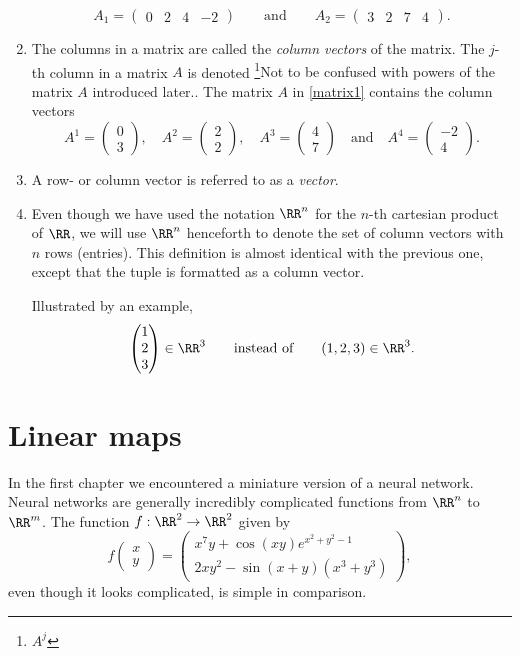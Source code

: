 \documentclass{article}
\begin{document}
\begin{enumerate}
$$
A_1 = \begin{pmatrix}
0 & 2 & 4 & -2
\end{pmatrix}
\qquad\text{and}\qquad
A_2 = \begin{pmatrix}
3 & 2 & 7 & 4
\end{pmatrix}.
$$
\item
  The columns in a matrix are called the \emph{column vectors} of the matrix.
The $j$-th column in a matrix $A$ is denoted \footnote{$A^j$}{Not to be confused with powers of the matrix $A$ introduced later.}.
The matrix $A$ in \eqref{matrix1} contains the column vectors
$$
A^1 = \begin{pmatrix}
0 \\ 3
\end{pmatrix},\quad
A^2 =\begin{pmatrix}
2 \\ 2
\end{pmatrix},\quad
A^3 =\begin{pmatrix}
4 \\ 7
\end{pmatrix}\quad\text{and}\quad
A^4 = \begin{pmatrix}
-2 \\ 4
\end{pmatrix}.
$$
 
\item
  A row- or column vector is referred to as a \emph{vector}.
\item
  Even though we have used the notation $\RR^n$ for the $n$-th cartesian product of $\RR$, we
  will use $\RR^n$ henceforth to denote the set of column vectors with $n$ rows (entries). This
  definition is almost identical with the previous one, except that the tuple is formatted as
  a column vector.

  Illustrated by an example, 
  $$
  \begin{pmatrix} 1 \\ 2 \\ 3 \end{pmatrix} \in \RR^3\qquad\text{instead of}\qquad (1, 2, 3)\in \RR^3.
  $$
\end{enumerate}



\section{Linear maps}\label{sectionLM}

In the first chapter we encountered a miniature version of a neural
network. Neural networks are generally incredibly complicated functions
from $\RR^n$ to $\RR^m$. The function $f:\RR^2\rightarrow \RR^2$
given by
$$
f\begin{pmatrix}
  x \\ y
\end{pmatrix} =
\begin{pmatrix}
  x^7 y + \cos(x y) e^{x^2 + y^2 -1}\\
  2 x y^2 - \sin(x + y) (x^3 + y^3)
\end{pmatrix},
$$
even though it looks complicated, is simple in comparison.
\end{document}
